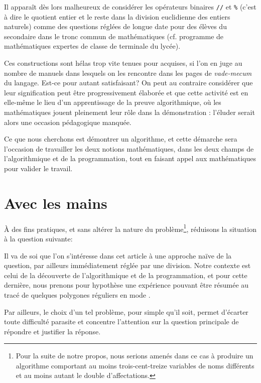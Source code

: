 Il apparaît dès lors malheureux de considérer les opérateurs binaires \texttt{//} et \texttt{\%} (c'est à dire le quotient entier et le reste dans la division euclidienne des entiers naturels) comme des questions réglées de longue date pour des élèves du secondaire dans le tronc commun de mathématiques (cf. programme de mathématiques expertes de classe de terminale du lycée).

Ces constructions sont hélas trop vite tenues pour acquises, si l'on en juge au nombre de manuels dans lesquels on les rencontre dans les pages de \emph{vade-mecum} du langage. Est-ce pour autant satisfaisant? On peut au contraire considérer que leur signification peut être progressivement élaborée et que cette activité est en elle-même le lieu d'un apprentissage de la preuve algorithmique, où les mathématiques jouent pleinement leur rôle dans la démonstration : l'éluder serait alors une occasion pédagogique manquée.

Ce que nous cherchons est démontrer un algorithme, et cette démarche sera l'occasion de travailler les deux notions mathématiques, dans les deux champs de l'algorithmique et de la programmation, tout en faisant appel aux mathématiques pour valider le travail.

\section{Avec les mains}

À des fins pratiques, et sans altérer la nature du problème\footnote{Pour la suite de notre propos, nous serions amenés dans ce cas à produire un algorithme comportant au moins trois-cent-treize variables de noms différents et au moins autant le double d'affectations.}, réduisons la situation à la question suivante:


Il va de soi que l'on s'intéresse dans cet article à une approche naïve de la question, par ailleurs immédiatement réglée par une division. Notre contexte est celui de la découverte de l'algorithmique et de la programmation, et pour cette dernière, nous prenons pour hypothèse une expérience pouvant être résumée au tracé de quelques polygones réguliers en mode .

Par ailleurs, le choix d'un tel problème, pour simple qu'il soit, permet d'écarter toute difficulté parasite et concentre l'attention sur la question principale de répondre et justifier la réponse.

